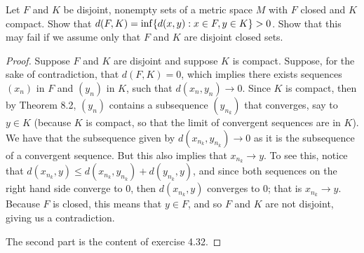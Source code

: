 \begin{exercise}{36}
Let $F$ and $K$ be disjoint, nonempty sets of a metric space $M$ with $F$ closed and $K$ compact.
Show that $d(F,K) = \inf\{d(x,y):x\in F, y\in K\}>0$.
Show that this may fail if we assume only that $F$ and $K$ are disjoint closed sets.
\end{exercise}
\begin{proof}
Suppose $F$ and $K$ are disjoint and suppose $K$ is compact.
Suppose, for the sake of contradiction, that $d(F,K)=0$, which implies there exists sequences $(x_n)$ in $F$ and $(y_n)$ in $K$, such that $d(x_n,y_n) \to 0$.
Since $K$ is compact, then by Theorem 8.2, $(y_n)$ contains a subsequence $(y_{n_k})$ that converges, say to $y\in K$ (because $K$ is compact, so that the limit of convergent sequences are in $K$).
We have that the subsequence given by $d(x_{n_k}, y_{n_k}) \to 0$ as it is the subsequence of a convergent sequence.
But this also implies that $x_{n_k}\to y$.
To see this, notice that $d(x_{n_k}, y) \leq d(x_{n_k},y_{n_k}) + d(y_{n_k}, y)$, and since both sequences on the right hand side converge to 0, then $d(x_{n_k},y)$ converges to 0;
that is $x_{n_k}\to y$.
Because $F$ is closed, this means that $y\in F$, and so $F$ and $K$ are not disjoint, giving us a contradiction.

The second part is the content of exercise 4.32.
\end{proof} 
